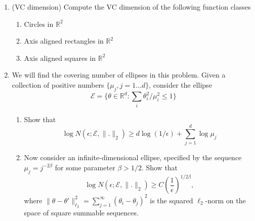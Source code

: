 \documentclass[11pt]{article}
\newcommand{\R}{\mathbb{R}}
\begin{document}
\begin{enumerate}
\begin{enumerate}
\begin{enumerate}
	\end{enumerate}
\end{enumerate}
 \item (VC dimension) Compute the VC dimension of the following function classes
\begin{enumerate}
	\item Circles in $\R^2$
	\item Axis aligned rectangles in $\R^2$
	\item Axis aligned squares in $\R^2$
\end{enumerate}
\item We will find the covering number of ellipses in this problem.  Given a collection of positive numbers $\{\mu_j,j=1\dots d\}$, consider the ellipse $$\mathcal{E}=\{\theta\in\R^d : \sum_i \theta_i^2/\mu_i^2\leq 1\}$$
\begin{enumerate}
	\item Show that $$\log N(\epsilon; \mathcal{E},\|.\|_2)\geq d\log (1/\epsilon)+\sum_{j=1}^d\log \mu_j$$
	\item Now consider an infinite-dimensional ellipse, specified by the sequence $\mu_j = j^{-2\beta}$
	for some parameter $\beta > 1/2$. Show that
	$$\log N(\epsilon; \mathcal{E},\|.\|_2)\geq C \left(\frac{1}{\epsilon}\right)^{1/2\beta},$$
	where $\|\theta-\theta'\|_{\ell_2}^2=\sum_{j=1}^\infty (\theta_i-\theta_j)^2$ is the squared $\ell_2$-norm on the space of square summable sequences.
\end{enumerate}
\end{enumerate}
\end{document}
